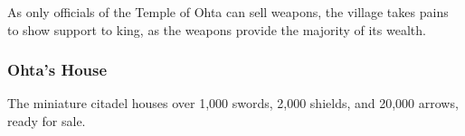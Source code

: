 \begin{multicols}{2}
As only officials of the Temple of Ohta can sell weapons, the village takes pains to show support to \gls{king}, as the weapons provide the majority of its wealth.

\subsubsection{Ohta's House}

The miniature citadel houses over 1,000 swords, 2,000 shields, and 20,000 arrows, ready for sale.



\label{solus}

\end{multicols}


